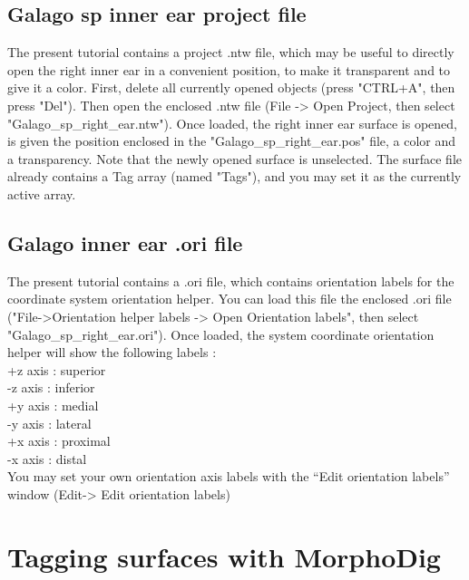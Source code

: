 \documentclass[12pt, a4paper]{book}
\begin{document}
\subsection{Galago sp inner ear project file}
The present tutorial contains a project .ntw file, which may be useful to directly open the right inner ear
 in a convenient position, to make it transparent and to give it a color. First, delete all currently opened objects
(press "CTRL+A", then press "Del"). Then open the enclosed .ntw file (File -> Open Project, then select
"Galago\_sp\_right\_ear.ntw"). Once loaded, the right inner ear surface is opened, is given the position
enclosed in the "Galago\_sp\_right\_ear.pos" file, a color and a transparency. Note that the newly opened
surface is unselected. The surface file already contains a Tag array (named "Tags"), and you may set it as the currently active array.\\



\subsection{Galago inner ear .ori file}
The present tutorial contains a .ori file, which contains orientation labels for the coordinate system
orientation helper. You can load this file the enclosed .ori file ("File->Orientation helper labels -> Open Orientation labels", then select
"Galago\_sp\_right\_ear.ori"). Once loaded, the system coordinate orientation helper will show the following
labels :\\
+z axis : superior\\
-z axis : inferior\\
+y axis : medial\\
-y axis : lateral\\
+x axis : proximal\\
-x axis : distal\\
You may set your own orientation axis labels with the “Edit orientation labels” window (Edit-> Edit orientation labels)

\section{Tagging surfaces with MorphoDig}
\end{document}
